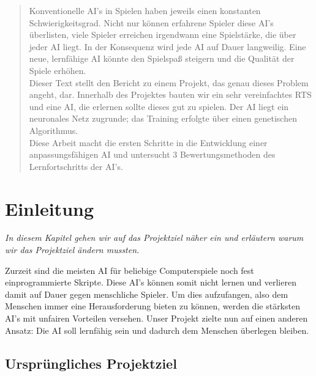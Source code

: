 \documentclass[
	12pt,
	a4paper,
	BCOR10mm,
	DIV14,
	headsepline,
	usegeometry,
]{scrreprt}
\begin{document}
\restoregeometry


\tableofcontents

\begin{abstract}
Konventionelle AI's in Spielen haben jeweils einen konstanten Schwierigkeitsgrad. Nicht nur können erfahrene Spieler diese AI's überlisten, viele Spieler erreichen irgendwann eine Spielstärke, die über jeder AI liegt. In der Konsequenz wird jede AI auf Dauer langweilig. Eine neue, lernfähige AI könnte den Spielspaß steigern und die Qualität der Spiele erhöhen.\\
Dieser Text stellt den Bericht zu einem Projekt, das genau dieses Problem angeht, dar. 
Innerhalb des Projektes bauten wir ein sehr vereinfachtes RTS und eine AI, die erlernen sollte dieses gut zu spielen. 
Der AI liegt ein neuronales Netz zugrunde; das Training erfolgte über einen genetischen Algorithmus.\\
Diese Arbeit macht die ersten Schritte in die Entwicklung einer anpassungsfähigen AI und untersucht 3 Bewertungsmethoden des Lernfortschritts der AI's.
\end{abstract}


\chapter{Einleitung}
\label{Einleitung}

\textit{%
In diesem Kapitel gehen wir auf das Projektziel näher ein und erläutern warum wir das Projektziel ändern mussten.
}

\bigskip

Zurzeit sind die meisten AI für beliebige Computerspiele noch fest einprogrammierte Skripte. Diese AI's können somit nicht lernen und verlieren damit auf Dauer gegen menschliche Spieler. Um dies aufzufangen, also dem Menschen immer eine Herausforderung bieten zu können, werden die stärksten AI's mit unfairen Vorteilen versehen. Unser Projekt zielte nun auf einen anderen Ansatz: Die AI soll lernfähig sein und dadurch dem Menschen überlegen bleiben.

\section{Ursprüngliches Projektziel}
\end{document}
